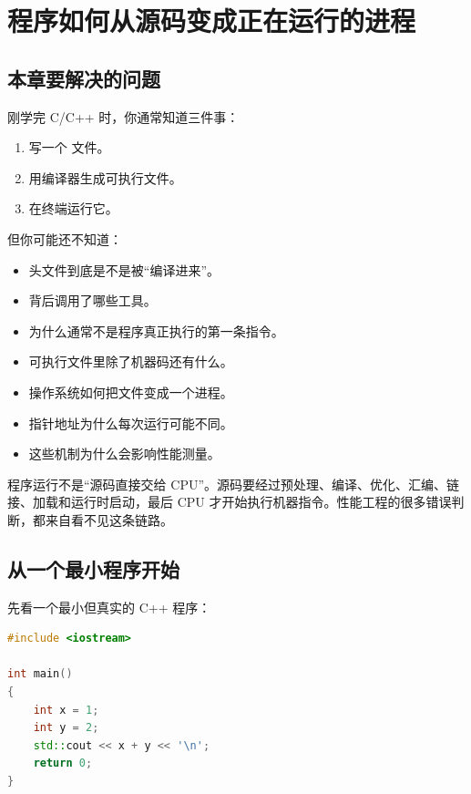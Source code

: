 \section{程序如何从源码变成正在运行的进程}

\subsection{本章要解决的问题}

刚学完 C/C++ 时，你通常知道三件事：

\begin{enumerate}
  \item 写一个  文件。
  \item 用编译器生成可执行文件。
  \item 在终端运行它。
\end{enumerate}

但你可能还不知道：

\begin{itemize}
  \item 头文件到底是不是被“编译进来”。
  \item {} 背后调用了哪些工具。
  \item {} 为什么通常不是程序真正执行的第一条指令。
  \item 可执行文件里除了机器码还有什么。
  \item 操作系统如何把文件变成一个进程。
  \item 指针地址为什么每次运行可能不同。
  \item 这些机制为什么会影响性能测量。
\end{itemize}

\begin{keyidea}
程序运行不是“源码直接交给 CPU”。源码要经过预处理、编译、优化、汇编、链接、加载和运行时启动，最后 CPU 才开始执行机器指令。性能工程的很多错误判断，都来自看不见这条链路。
\end{keyidea}

\subsection{从一个最小程序开始}

先看一个最小但真实的 C++ 程序：

\begin{lstlisting}[language=C++]
#include <iostream>

int main()
{
    int x = 1;
    int y = 2;
    std::cout << x + y << '\n';
    return 0;
}
\end{lstlisting}

